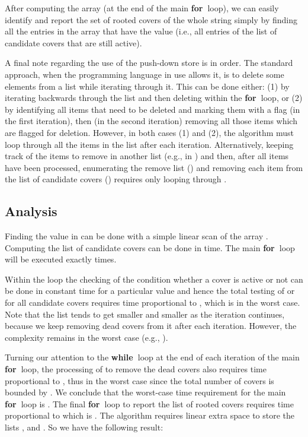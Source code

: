 \documentclass[runningheads,a4paper]{llncs}
\def\bfor{{\bf for\ }}
\def\bwhile{{\bf while\ }}
\begin{document}
After computing the array  (at the end of the main \bfor loop), we can
easily identify and report the set of rooted covers of the whole string 
simply by finding all the entries in the array  that have the value 
(i.e., all entries of the list of candidate covers that are still active).

A final note regarding the use of the push-down store  is in
order. The standard approach, when the programming
language in use allows it, is to delete some elements from a list while iterating through it.
This can be done either: (1) by iterating backwards through the list and then
deleting within the \bfor loop, or (2) by identifying all items that need
to be deleted and marking them with a flag (in the first iteration), then (in
the second iteration) removing all those items which are flagged for
deletion. However, in  both cases (1) and (2), the algorithm must loop
through all the items in the list  after each iteration.
Alternatively, keeping track of the items to remove in another list (e.g.,
in ) and then, after all items have been processed, enumerating the
remove list () and removing each item from the list of candidate
covers () requires only looping through . 

\subsection{Analysis}
Finding the value  in  can be done with a simple linear
scan of the array . Computing the list  of candidate covers can be
done in  time. The main \bfor loop will be executed exactly  times.

Within the loop the checking of the condition whether a cover is active or not
can be done in constant
time for a particular value and hence the total testing of  or  for
all candidate covers requires time proportional to , which is
 in the worst case. Note that the list  tends to get smaller
and smaller as the iteration continues, because we keep removing dead covers
from it after each iteration. However, the complexity remains  in the
worst case (e.g., ).

Turning our attention to the \bwhile loop at the end of each iteration of
the main \bfor loop, the processing of  to remove the dead
covers also requires time proportional to
, thus  in the worst case since the total number of
covers is bounded by . We conclude that the worst-case time requirement
for the main \bfor loop is . The
final \bfor loop to report the list of rooted covers requires
time proportional to  which is .
The algorithm requires linear extra space to store the lists
,  and . So we have the following result:
\end{document}
